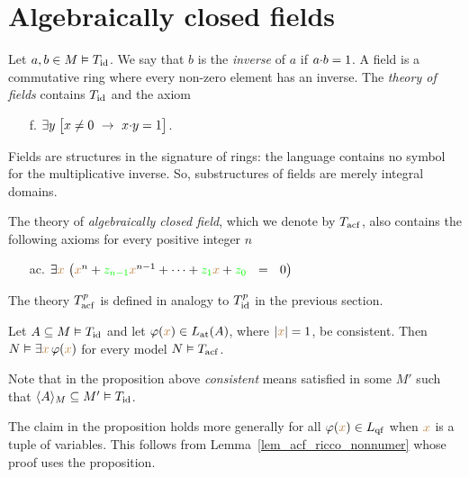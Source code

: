 \section{Algebraically closed fields}

Let $a,b\in M\models T_{\rm id}$.
%
We say that $b$ is the \emph{inverse\/} of $a$ if $a\mdot b=1$.
%
A field is a commutative ring where every non-zero element has an inverse.
%
The \emph{theory of fields\/} contains $T_{\rm id}$ and the axiom
\begin{itemize}
\item[f.]$\E  y\; \big[x\neq0\ \imp\ x\mdot y =1\big]$.
\end{itemize}
Fields are structures in the signature of rings: the language contains no symbol for the multiplicative inverse.
%
So, substructures of fields are merely integral domains.

The theory of \emph{algebraically closed field}, which we denote by \emph{$T_{\rm acf}$}, also contains the following axioms for every positive integer $n$

\begin{itemize}
\item[ac.] $\E {\mr x}\ \big( {\mr x}^{n} + {\gr z_{n-1}} {\mr x}^{n-1} + \dots + {\gr z_1}  {\mr x} + {\gr z_0}\ \ =\ \ 0\big)$
\end{itemize}

The theory \emph{$T^p_{\rm acf}$} is defined in analogy to $T^p_{\rm id}$ in the previous section.

\begin{proposition}\label{prop_acf_cons_sodd}
Let $A\subseteq M\models T_{\rm id}$ and let $\phi({\mr x})\in L_{\rm at}(A)$, where $|{\mr x}|=1$, be consistent.
%
Then $N\models\E {\mr x} \,\phi({\mr x})$ for every model $N\models T_{\rm acf}$.
\end{proposition}

Note that in the proposition above \textit{consistent\/} means satisfied in some $M'$ such that $\<A\>_M\subseteq M'\models T_{\rm id}$.

The claim in the proposition holds more generally for all $\phi({\mr x})\in L_{\rm qf}$ when ${\mr x}$ is a tuple of variables.
%
This follows from Lemma~\ref{lem_acf_ricco_nonnumer} whose proof uses the proposition.

